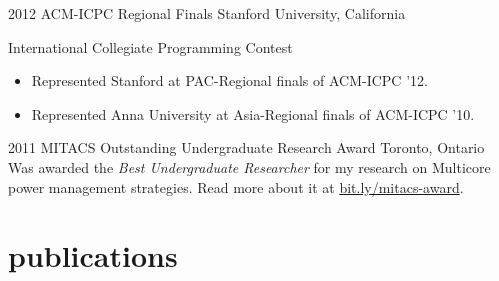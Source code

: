 \documentclass[]{friggeri-cv} %
\begin{document}
\begin{entrylist}
\entry
{2012}
{ACM-ICPC Regional Finals}
{Stanford University, California}
{International Collegiate Programming Contest
\begin{itemize}
\item Represented Stanford at PAC-Regional finals of ACM-ICPC '12.
\item Represented Anna University at Asia-Regional finals of ACM-ICPC '10. 
\end{itemize}
}
\entry
{2011}
{MITACS Outstanding Undergraduate Research Award}
{Toronto, Ontario}
{Was awarded the \emph{Best Undergraduate Researcher} for my research on Multicore power management strategies. Read more about it at \href{http://bit.ly/mitacs-award}{bit.ly/mitacs-award}.}
\end{entrylist}





\section{publications}



\begin{refsection} %
\nocite{*}
\printbibliography[sorting=chronological, type=inproceedings, title={international peer-reviewed conferences/proceedings}, notkeyword={france}, heading=subbibliography]
\end{refsection}



\end{document}
